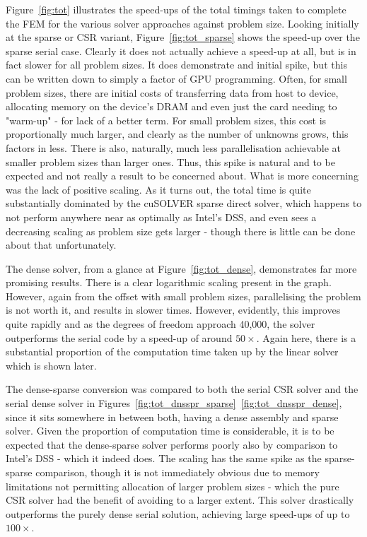 Figure~\ref{fig:tot} illustrates the speed-ups of the total timings taken to complete the FEM for the various solver approaches against problem size. Looking initially at the sparse or CSR variant, Figure~\ref{fig:tot_sparse} shows the speed-up over the sparse serial case. Clearly it does not actually achieve a speed-up at all, but is in fact slower for all problem sizes. It does demonstrate and initial spike, but this can be written down to simply a factor of GPU programming. Often, for small problem sizes, there are initial costs of transferring data from host to device, allocating memory on the device's DRAM and even just the card needing to "warm-up" - for lack of a better term.  For small problem sizes, this cost is proportionally much larger, and clearly as the number of unknowns grows, this factors in less. There is also, naturally, much less parallelisation achievable at smaller problem sizes than larger ones. Thus, this spike is natural and to be expected and not really a result to be concerned about. What is more concerning was the lack of positive scaling. As it turns out, the total time is quite substantially dominated by the cuSOLVER sparse direct solver, which happens to not perform anywhere near as optimally as Intel's DSS, and even sees a decreasing scaling as problem size gets larger - though there is little can be done about that unfortunately.

The dense solver, from a glance at Figure~\ref{fig:tot_dense}, demonstrates far more promising results. There is a clear logarithmic scaling present in the graph. However, again from the offset with small problem sizes, parallelising the problem is not worth it, and results in slower times. However, evidently, this improves quite rapidly and as the degrees of freedom approach 40,000, the solver outperforms the serial code by a speed-up of around $50\times$. Again here, there is a substantial proportion of the computation time taken up by the linear solver which is shown later.

The dense-sparse conversion was compared to both the serial CSR solver and the serial dense solver in Figures~\ref{fig:tot_dnsspr_sparse}~\ref{fig:tot_dnsspr_dense}, since it sits somewhere in between both, having a dense assembly and sparse solver. Given the proportion of computation time is considerable, it is to be expected that the dense-sparse solver performs poorly also by comparison to Intel's DSS - which it indeed does. The scaling has the same spike as the sparse-sparse comparison, though it is not immediately obvious due to memory limitations not permitting allocation of  larger problem sizes - which the pure CSR solver had the benefit of avoiding to a larger extent. This solver drastically outperforms the purely dense serial solution, achieving large speed-ups of up to $100\times$.

